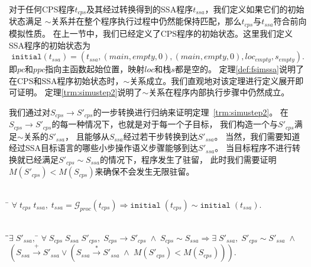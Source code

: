 对于任何CPS程序$t_{cps}$及其经过转换得到的SSA程序$t_{ssa}$，我们定义如果它们的初始状态满足
$\sim$关系并在整个程序执行过程中仍然能保持匹配，那么$t_{cps}$与$t_{ssa}$符合前向模拟性质。
在上一节中，我们已经定义了CPS程序的初始状态。这里我们定义SSA程序的初始状态为
\begin{equation}
\mathtt{initial}(t_{ssa}) = (t_{ssa}, (main, empty, 0), (main, empty, 0),loc_{empty}, s_{empty}).
\end{equation}
即$pc$和$ppc$指向主函数起始位置，映射$loc$和栈$s$都是空的。
定理\ref{def:fsimssa}说明了在CPS和SSA程序初始状态时，$\sim$关系成立。我们直观地对该定理进行定义展开即可证明。
定理\ref{trm:simustep2}说明了$\sim$关系在程序内部执行步骤中仍然成立。

我们通过对$S_{cps}\rightarrow S'_{cps}$的一步转换进行归纳来证明定理~\ref{trm:simustep2}。
在$S_{cps}\rightarrow S'_{cps}$的每一种情况下，也就是对于每一个子目标，
我们构造一个与$S'_{cps}$满足$\sim$关系的$S'_{ssa}$，
且能够从$S_{ssa}$经过若干步转换到达$S'_{ssa}$。
当然，我们需要知道经过SSA目标语言的哪些小步操作语义步骤能够到达$S'_{ssa}$。
当目标程序不进行转换就已经满足$S'_{cps}\sim S_{ssa}$的情况下，程序发生了驻留，
此时我们需要证明$M(S'_{cps})<M(S_{cps})$来确保不会发生无限驻留。

\begin{theorem}[CPS到SSA转换中初始状态的模拟]\label{def:fsimssa}
    \begin{tabbing}
      \\
        \quad\=\kill 
        \>$\forall\; t_{cps} \; t_{ssa},\;
        t_{ssa}=\mathcal{G}_{proc}(t_{cps})\Longrightarrow \mathtt{initial}\; (t_{cps})
        \sim \mathtt{initial}\; (t_{ssa}).$
    \end{tabbing}
  \end{theorem}

  \begin{theorem}[CPS到SSA转换中程序内部执行步骤的模拟]\label{trm:simustep2}
    \begin{tabbing}
      \\
    \quad\=\qquad\=$\exists\; S'_{ssa},\; $\=\kill
    \>$\forall \; S_{cps}\; S_{ssa}\; S'_{cps},\; S_{cps}\rightarrow S'_{cps}\; \wedge \; S_{cps}\sim S_{ssa} \Longrightarrow \exists\; S'_{ssa},\; S'_{cps}\sim S'_{ssa}\; \wedge$\\
    \>\>$(S_{ssa}\xrightarrow{+} S'_{ssa} \lor  (S_{ssa}\xrightarrow{*} S'_{ssa}\; \wedge \;  M(S'_{cps})<M(S_{cps})))$.
    \end{tabbing}
  \end{theorem}

